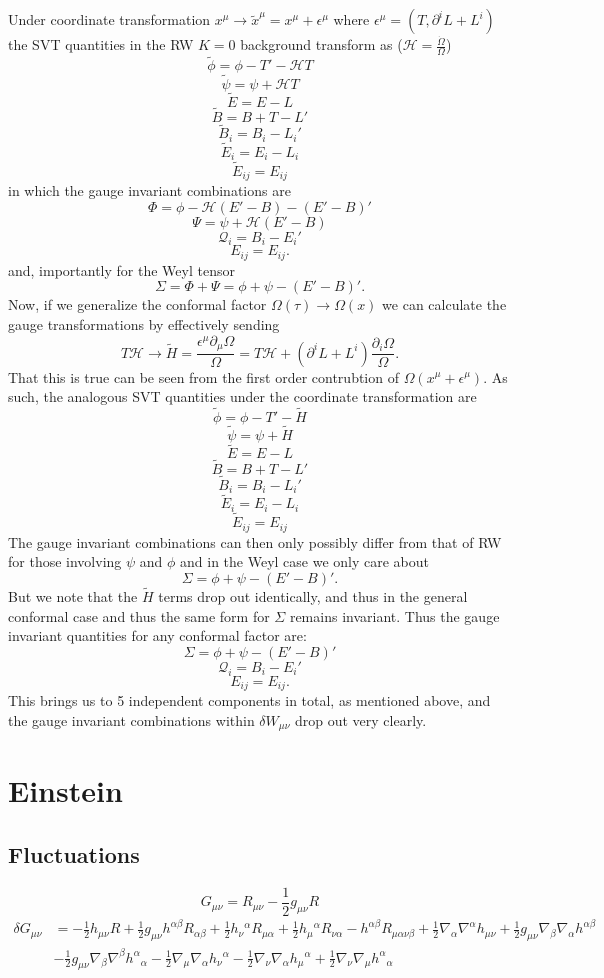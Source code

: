 \documentclass[10pt,letterpaper]{article}
\newcommand{\be}{\begin{equation}} %
\newcommand{\ee}{\end{equation}} %
\newcommand{\ep}{\epsilon}
\newcommand{\pd}{\partial}
\newcommand{\hu}{\mathcal H}
\numberwithin{equation}{section}
\begin{document}
\\ \\
Under coordinate transformation $x^\mu \to \tilde x^\mu = x^\mu + \ep^\mu$ where $\ep^\mu = (T,\pd^i L + L^i)$ the SVT quantities in the RW $K=0$ background transform as ($\mathcal H = \frac{\dot\Omega}{\Omega}$)
\be
	\tilde \phi = \phi - T' -\hu T
\ee
\be
	\tilde \psi = \psi +\hu T
\ee
\be
	\tilde E = E - L
\ee
\be
	\tilde B = B + T - L'
\ee
\be
	\tilde B_i = B_i - L_i'
\ee
\be
	\tilde E_i = E_i - L_i
\ee
\be
	\tilde E_{ij} = E_{ij}
\ee
in which the gauge invariant combinations are
\be
	\Phi = \phi -\hu (E'-B) - (E' - B)'
\ee
\be
	\Psi = \psi + \hu(E'-B)
\ee
\be
	\mathcal Q_i = B_i - E_i'
\ee
\be
	E_{ij} = E_{ij}.
\ee
and, importantly for the Weyl tensor
\be
	\Sigma = \Phi + \Psi  = \phi + \psi - (E'-B)'.
\ee
Now, if we generalize the conformal factor $\Omega(\tau) \to \Omega(x)$ we can calculate the gauge transformations by effectively sending 
\be
	T\hu \to \tilde H = \frac{\ep^\mu \pd_\mu \Omega}{\Omega} = T\hu + (\pd^i L + L^i)\frac{\pd_i\Omega}{\Omega}.
\ee
That this is true can be seen from the first order contrubtion of $\Omega(x^\mu + \ep^\mu)$. As such, the analogous SVT quantities under the coordinate transformation are
\be
	\tilde \phi = \phi - T' -\tilde H 
\ee
\be
	\tilde \psi = \psi +\tilde H
\ee
\be
	\tilde E = E - L
\ee
\be
	\tilde B = B + T - L'
\ee
\be
	\tilde B_i = B_i - L_i'
\ee
\be
	\tilde E_i = E_i - L_i
\ee
\be
	\tilde E_{ij} = E_{ij}
\ee
The gauge invariant combinations can then only possibly differ from that of RW for those involving $\psi$ and $\phi$ and in the Weyl case we only care about 
\be
	\Sigma = \phi + \psi - (E'-B)'.
\ee
But we note that the $\tilde H$ terms drop out identically, and thus in the general conformal case and thus the same form for $\Sigma$ remains invariant. Thus the gauge invariant quantities for any conformal factor are:
\be
	\Sigma = \phi + \psi - (E'-B)'
\ee
\be
	\mathcal Q_i = B_i - E_i'
\ee
\be
	E_{ij} = E_{ij}.
\ee
This brings us to 5 independent components in total, as mentioned above, and the gauge invariant combinations within $\delta W_{\mu\nu}$ drop out very clearly.
\newpage
\section{Einstein}
\subsection{Fluctuations}
\be
	G_{\mu\nu} = R_{\mu\nu}-\frac12 g_{\mu\nu}R
\ee
\begin{align}
	\delta G_{\mu\nu} & = 
- \tfrac{1}{2} h_{\mu \nu} R + \tfrac{1}{2} g_{\mu \nu} h^{\alpha \beta} R_{\alpha \beta} + \tfrac{1}{2} h_{\nu}{}^{\alpha} R_{\mu \alpha} + \tfrac{1}{2} h_{\mu}{}^{\alpha} R_{\nu \alpha} -  h^{\alpha \beta} R_{\mu \alpha \nu \beta} + \tfrac{1}{2} \nabla_{\alpha}\nabla^{\alpha}h_{\mu \nu} + \tfrac{1}{2} g_{\mu \nu} \nabla_{\beta}\nabla_{\alpha}h^{\alpha \beta}\\
& -  \tfrac{1}{2} g_{\mu \nu} \nabla_{\beta}\nabla^{\beta}h^{\alpha}{}_{\alpha} -  \tfrac{1}{2} \nabla_{\mu}\nabla_{\alpha}h_{\nu}{}^{\alpha} -  \tfrac{1}{2} \nabla_{\nu}\nabla_{\alpha}h_{\mu}{}^{\alpha} + \tfrac{1}{2} \nabla_{\nu}\nabla_{\mu}h^{\alpha}{}_{\alpha} \nonumber
\end{align}
\end{document}
